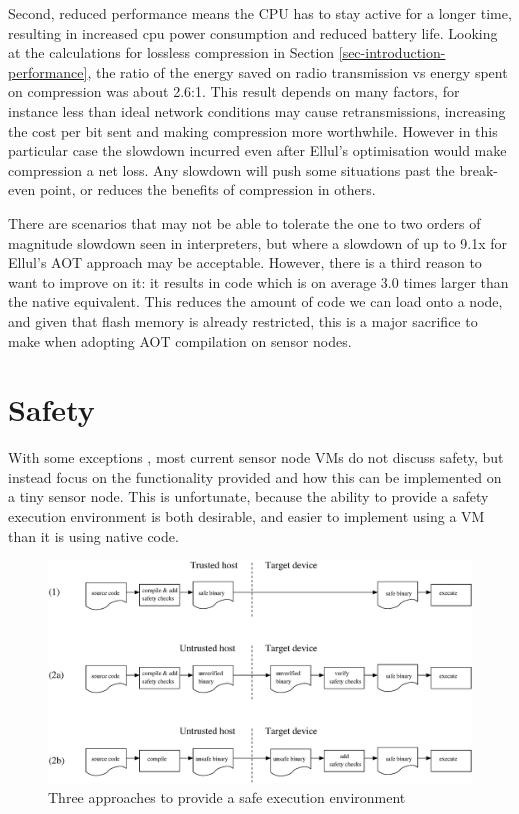 Second, reduced performance means the CPU has to stay active for a longer time, resulting in increased cpu power consumption and reduced battery life. Looking at the calculations for lossless compression in Section \ref{sec-introduction-performance}, the ratio of the energy saved on radio transmission vs energy spent on compression was about 2.6:1. This result depends on many factors, for instance less than ideal network conditions may cause retransmissions, increasing the cost per bit sent and making compression more worthwhile. However in this particular case the slowdown incurred even after Ellul's optimisation would make compression a net loss. Any slowdown will push some situations past the break-even point, or reduces the benefits of compression in others.

There are scenarios that may not be able to tolerate the one to two orders of magnitude slowdown seen in interpreters, but where a slowdown of up to 9.1x for Ellul's AOT approach may be acceptable. However, there is a third reason to want to improve on it: it results in code which is on average 3.0 times larger than the native equivalent. This reduces the amount of code we can load onto a node, and given that flash memory is already restricted, this is a major sacrifice to make when adopting AOT compilation on sensor nodes.


\section{Safety}
\label{sec-state-of-the-art-safety}
With some exceptions \cite{Evers:2010ur}, most current sensor node VMs do not discuss safety, but instead focus on the functionality provided and how this can be implemented on a tiny sensor node. This is unfortunate, because the ability to provide a safety execution environment is both desirable, and easier to implement using a VM than it is using native code.

\begin{figure}
\centering
\includegraphics[width=\linewidth]{safe-compilation-process.eps}
\caption{Three approaches to provide a safe execution environment}
\label{fig-safe-compilation-process}
\end{figure}

